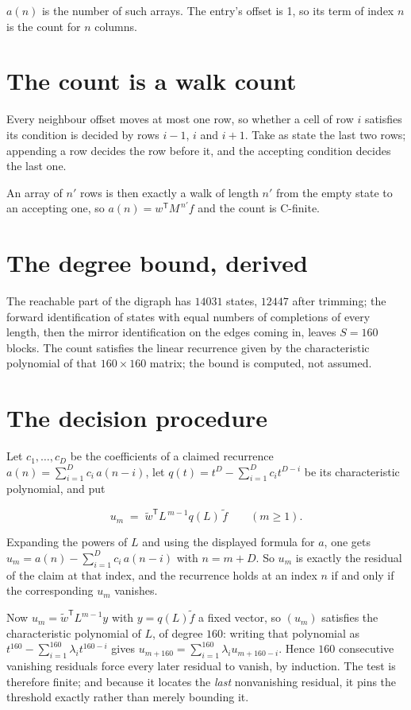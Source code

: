 \documentclass[11pt]{article}
\theoremstyle{definition}
\begin{document}
$a(n)$ is the number of such arrays. The entry's offset is 1, so its term of index $n$ is the count for $n$ columns.

\section{The count is a walk count}

Every neighbour offset moves at most one row, so whether a cell of row $i$ satisfies its condition is decided by rows $i-1$, $i$ and $i+1$. Take as state the last two rows; appending a row decides the row before it, and the accepting condition decides the last one.

An array of $n'$ rows is then exactly a walk of length $n'$ from the empty state to an accepting one, so $a(n) = w^{\mathsf T}M^{\,n'}f$ and the count is C-finite.

\section{The degree bound, derived}

The reachable part of the digraph has $14031$ states, $12447$ after trimming; the forward identification of states with equal numbers of completions of every length, then the mirror identification on the edges coming in, leaves $S = 160$ blocks. The count satisfies the linear recurrence given by the characteristic polynomial of that $160\times160$ matrix; the bound is computed, not assumed.

\section{The decision procedure}

Let $c_1,\dots,c_D$ be the coefficients of a claimed recurrence $a(n) = \sum_{i=1}^{D} c_i\,a(n-i)$, let $q(t) = t^{D} - \sum_{i=1}^{D} c_i t^{D-i}$ be its characteristic polynomial, and put

\[u_m \;=\; \tilde w^{\mathsf T} L^{\,m-1} q(L)\,\tilde f \qquad (m \ge 1).\]

Expanding the powers of $L$ and using the displayed formula for $a$, one gets $u_m = a(n) - \sum_{i=1}^{D} c_i\,a(n-i)$ with $n = m + D$. So $u_m$ is exactly the residual of the claim at that index, and the recurrence holds at an index $n$ if and only if the corresponding $u_m$ vanishes.

Now $u_m = \tilde w^{\mathsf T} L^{m-1} y$ with $y = q(L)\tilde f$ a fixed vector, so $(u_m)$ satisfies the characteristic polynomial of $L$, of degree $160$: writing that polynomial as $t^{160} - \sum_{i=1}^{160} \lambda_i t^{160-i}$ gives $u_{m+160} = \sum_{i=1}^{160} \lambda_i u_{m+160-i}$. Hence $160$ consecutive vanishing residuals force every later residual to vanish, by induction. The test is therefore finite; and because it locates the {\itshape last} nonvanishing residual, it pins the threshold exactly rather than merely bounding it.
\end{document}
